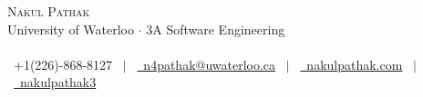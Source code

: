 \documentclass[11pt]{article}
\begin{document}
\small
\smallskip
\vspace*{-40pt}

\begin{center}
  {\Huge \scshape {Nakul Pathak}} \\
  \vspace*{6pt}
{\fontsize{10}{1}\selectfont University of Waterloo $\cdot$ 3A Software Engineering} \\
\vspace{-4pt}
\hspace*{-18pt} \hrulefill \\
\vspace{2pt}
\hspace*{-13pt} \faPhone \  +1(226)-868-8127 \ $|$ \  \href{mailto:n4pathak@uwaterloo.ca}{\faEnvelope \ n4pathak@uwaterloo.ca} \  $|$ \  \href{http://nakulpathak.com}{\faGlobe \ nakulpathak.com}  \ $|$ \   \href{https://github.com/nakulpathak3}{\faGithub \ nakulpathak3}
\vspace{-5pt}
\end{center}

\vspace{6pt}
\end{document}
